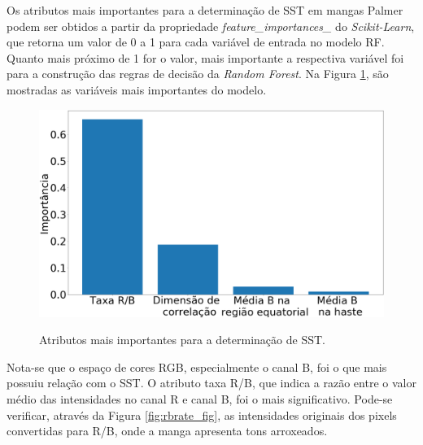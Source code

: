 Os atributos mais importantes para a determinação de SST em mangas Palmer podem ser obtidos a partir da propriedade \textit{feature\_importances\_} do \textit{Scikit-Learn}, que retorna um valor de 0 a 1 para cada variável de entrada no modelo RF. Quanto mais próximo de 1 for o valor, mais importante a respectiva variável foi para a construção das regras de decisão da \textit{Random Forest}. Na Figura \ref{fig:feat_import}, são mostradas as variáveis mais importantes do modelo.

\begin{figure}[H]
\centering
	\caption{Atributos mais importantes para a determinação de SST.}
	\includegraphics[scale=0.18]{img/feat_import_sst_palmer.png}
	\label{fig:feat_import}
\end{figure}

Nota-se que o espaço de cores RGB, especialmente o canal B, foi o que mais possuiu relação com o SST. O atributo taxa R/B, que indica a razão entre o valor médio das intensidades no canal R e canal B, foi o mais significativo. Pode-se verificar, através da Figura \ref{fig:rbrate_fig}, as intensidades originais dos pixels convertidas para R/B, onde a manga apresenta tons arroxeados.

